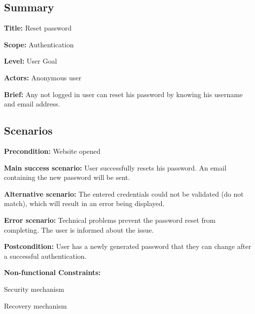 \subsection*{Summary}


\begin{DoxyItemize}
\item {\bfseries Title\+:} Reset password
\item {\bfseries Scope\+:} Authentication
\item {\bfseries Level\+:} User Goal
\item {\bfseries Actors\+:} Anonymous user
\item {\bfseries Brief\+:} Any not logged in user can reset his password by knowing his username and email address.
\end{DoxyItemize}

\subsection*{Scenarios}


\begin{DoxyItemize}
\item {\bfseries Precondition\+:} Website opened
\item {\bfseries Main success scenario\+:} User successfully resets his password. An email containing the new password will be sent.
\item {\bfseries Alternative scenario\+:} The entered credentials could not be validated (do not match), which will result in an error being displayed.
\item {\bfseries Error scenario\+:} Technical problems prevent the password reset from completing. The user is informed about the issue.
\item {\bfseries Postcondition\+:} User has a newly generated password that they can change after a successful authentication.
\item {\bfseries Non-\/functional Constraints\+:}
\begin{DoxyItemize}
\item Security mechanism
\item Recovery mechanism 
\end{DoxyItemize}
\end{DoxyItemize}